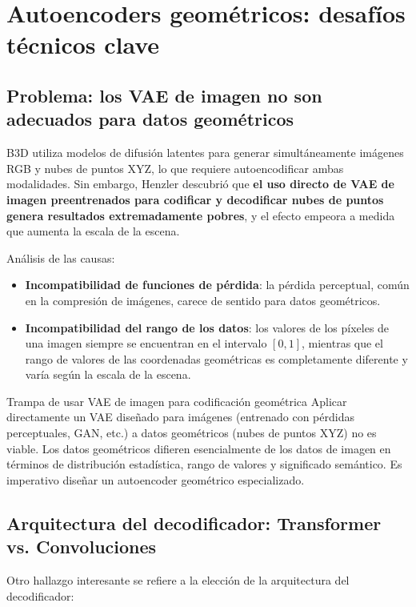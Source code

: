 \section{Autoencoders geométricos: desafíos técnicos clave}

\subsection{Problema: los VAE de imagen no son adecuados para datos geométricos}

B3D utiliza modelos de difusión latentes para generar simultáneamente imágenes RGB y nubes de puntos XYZ, lo que requiere autoencodificar ambas modalidades. Sin embargo, Henzler descubrió que \textbf{el uso directo de VAE de imagen preentrenados para codificar y decodificar nubes de puntos genera resultados extremadamente pobres}, y el efecto empeora a medida que aumenta la escala de la escena.

Análisis de las causas:
\begin{itemize}
    \item \textbf{Incompatibilidad de funciones de pérdida}: la pérdida perceptual, común en la compresión de imágenes, carece de sentido para datos geométricos.
    \item \textbf{Incompatibilidad del rango de los datos}: los valores de los píxeles de una imagen siempre se encuentran en el intervalo $[0, 1]$, mientras que el rango de valores de las coordenadas geométricas es completamente diferente y varía según la escala de la escena.
\end{itemize}

\begin{warningbox}{Trampa de usar VAE de imagen para codificación geométrica}
Aplicar directamente un VAE diseñado para imágenes (entrenado con pérdidas perceptuales, GAN, etc.) a datos geométricos (nubes de puntos XYZ) no es viable. Los datos geométricos difieren esencialmente de los datos de imagen en términos de distribución estadística, rango de valores y significado semántico. Es imperativo diseñar un autoencoder geométrico especializado.
\end{warningbox}

\subsection{Arquitectura del decodificador: Transformer vs. Convoluciones}

Otro hallazgo interesante se refiere a la elección de la arquitectura del decodificador:

